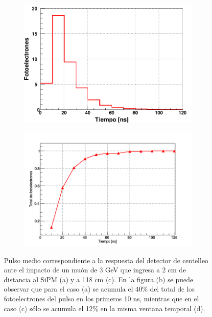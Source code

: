 \documentclass[12pt,oneside,openany,letter]{book}
\begin{document}
\begin{figure}[h!]
\begin{subfigure}{0.5\textwidth}
    \end{subfigure}
    \begin{subfigure}{0.44\textwidth}
        \includegraphics[width=\textwidth]{a118cm_pulso.png}
        \caption{}
        \label{a118cm_pulso}
    \end{subfigure}
    \begin{subfigure}{0.5\textwidth}
        \includegraphics[width=\textwidth]{118cmcum.png}
        \caption{}
        \label{118cmcum}
    \end{subfigure}
    \caption[Pulso medio correspondiente a un muón de 3 GeV en el detector de centelleo]{Pulso medio correspondiente a la respuesta del detector de centelleo ante el impacto de un muón de 3 GeV que ingresa a 2 cm de distancia al SiPM (a) y a 118 cm (c). En la figura (b) se puede observar que para el caso (a) se acumula el 40\% del total de los fotoelectrones del pulso en los primeros 10 ns, mientras que en el caso (c) sólo se acumula el 12\% en la misma ventana temporal (d).}\label{Pulsos_barra}
\end{figure}
\end{document}
